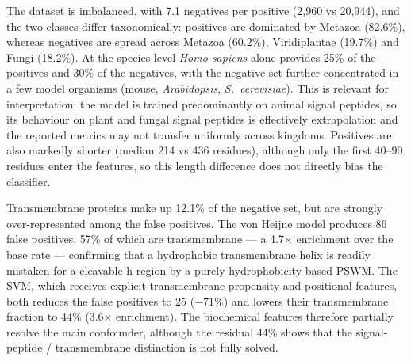 The dataset is imbalanced, with 7.1 negatives per positive (2{,}960 vs
20{,}944), and the two classes differ taxonomically: positives are
dominated by Metazoa (82.6\%), whereas negatives are spread across
Metazoa (60.2\%), Viridiplantae (19.7\%) and Fungi (18.2\%). At the
species level \emph{Homo sapiens} alone provides 25\% of the positives
and 30\% of the negatives, with the negative set further concentrated in
a few model organisms (mouse, \emph{Arabidopsis}, \emph{S.\ cerevisiae}).
This is relevant for interpretation: the model is trained predominantly
on animal signal peptides, so its behaviour on plant and fungal signal
peptides is effectively extrapolation and the reported metrics may not
transfer uniformly across kingdoms. Positives are also markedly shorter
(median 214 vs 436 residues), although only the first 40--90 residues
enter the features, so this length difference does not directly bias the
classifier.


Transmembrane proteins make up 12.1\% of the negative set, but are
strongly over-represented among the false positives. The von Heijne
model produces 86 false positives, 57\% of which are transmembrane --- a
4.7$\times$ enrichment over the base rate --- confirming that a
hydrophobic transmembrane helix is readily mistaken for a cleavable
h-region by a purely hydrophobicity-based PSWM. The SVM, which receives
explicit transmembrane-propensity and positional features, both reduces
the false positives to 25 ($-71\%$) and lowers their transmembrane
fraction to 44\% (3.6$\times$ enrichment). The biochemical features
therefore partially resolve the main confounder, although the residual
44\% shows that the signal-peptide / transmembrane distinction is not
fully solved.



